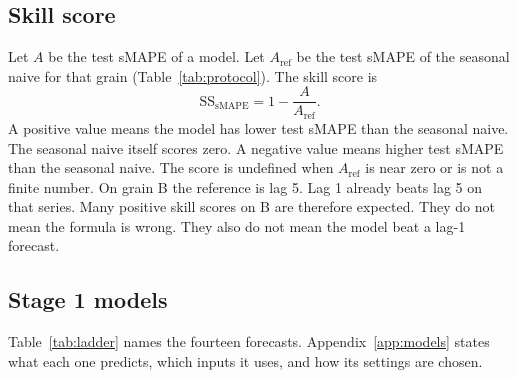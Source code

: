 \subsection{Skill score}
\label{sec:ss}

Let $A$ be the test sMAPE of a model.
Let $A_{\mathrm{ref}}$ be the test sMAPE of the seasonal naive for that grain (Table~\ref{tab:protocol}).
The skill score is
\begin{equation}
  \mathrm{SS}_{\mathrm{sMAPE}}
  = 1 - \frac{A}{A_{\mathrm{ref}}}.
  \label{eq:ss}
\end{equation}
A positive value means the model has lower test sMAPE than the seasonal naive.
The seasonal naive itself scores zero.
A negative value means higher test sMAPE than the seasonal naive.
The score is undefined when $A_{\mathrm{ref}}$ is near zero or is not a finite number.
On grain B the reference is lag 5.
Lag 1 already beats lag 5 on that series.
Many positive skill scores on B are therefore expected.
They do not mean the formula is wrong.
They also do not mean the model beat a lag-1 forecast.

\subsection{Stage 1 models}
\label{sec:m0m9}

Table~\ref{tab:ladder} names the fourteen forecasts.
Appendix~\ref{app:models} states what each one predicts, which inputs it uses, and how its settings are chosen.

